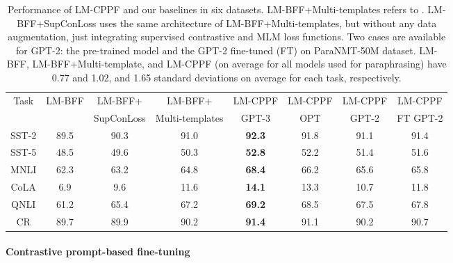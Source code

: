 \documentclass[11pt]{article}
\begin{document}
\begin{table*}[]
\centering
    \tabcolsep=0.14cm
    \begin{tabular}{c|ccc|cc|cc}
    \hline
    \multirow{2}{*}{Task} & \multirow{2}{*}{LM-BFF} & LM-BFF+    & LM-BFF+                 & LM-CPPF       & LM-CPPF & LM-CPPF & LM-CPPF          \\
                          &                         & SupConLoss & Multi-templates & GPT-3         & OPT     & GPT-2   & FT GPT-2 \\ \hline
    SST-2                 & 89.5                    & 90.3       & 91.0                    & \textbf{92.3} & 91.8    & 91.1    & 91.4             \\
    SST-5                 & 48.5                    & 49.6       & 50.3                    & \textbf{52.8} & 52.2    & 51.4    & 51.6             \\
    MNLI                  & 62.3                    & 63.2       & 64.8                    & \textbf{68.4} & 66.2    & 65.6    & 65.8             \\
    CoLA                  & 6.9                     & 9.6        & 11.6                    & \textbf{14.1} & 13.3    & 10.7    & 11.8             \\
    QNLI                  & 61.2                    & 65.4       & 67.2                    & \textbf{69.2} & 68.5    & 67.5    & 67.8             \\
    CR                    & 89.7                    & 89.9       & 90.2                    & \textbf{91.4} & 91.1    & 90.2    & 90.7             \\ \hline
    \end{tabular}
    \caption{\label{table:paraphraseFinetuneRes} Performance of LM-CPPF and our baselines in six datasets. LM-BFF+Multi-templates refers to . LM-BFF+SupConLoss uses the same architecture of LM-BFF+Multi-templates, but without any data augmentation, just integrating supervised contrastive and MLM loss functions. Two cases are available for GPT-2: the pre-trained model and the GPT-2 fine-tuned (FT) on ParaNMT-50M \cite{wieting-gimpel-2018-paranmt} dataset.
    LM-BFF, LM-BFF+Multi-template, and  LM-CPPF (on average for all models used for paraphrasing) have 0.77 and 1.02, and 1.65 standard deviations on average for each task, respectively.}
\end{table*}

\paragraph{Contrastive prompt-based fine-tuning}
\end{document}
